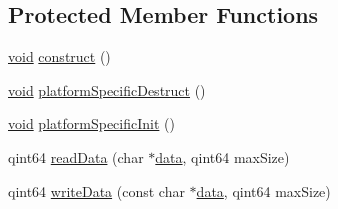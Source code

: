 \subsection*{Protected Member Functions}
\begin{DoxyCompactItemize}
\item 
\hyperlink{group___u_a_v_objects_plugin_ga444cf2ff3f0ecbe028adce838d373f5c}{void} \hyperlink{class_qext_serial_port_ab53747b8ff712492f96dc2f5cdb8b67a}{construct} ()
\item 
\hyperlink{group___u_a_v_objects_plugin_ga444cf2ff3f0ecbe028adce838d373f5c}{void} \hyperlink{class_qext_serial_port_a063fb59c7e39c6d232d72d1cfed80f62}{platform\-Specific\-Destruct} ()
\item 
\hyperlink{group___u_a_v_objects_plugin_ga444cf2ff3f0ecbe028adce838d373f5c}{void} \hyperlink{class_qext_serial_port_af03212eb598873e57e40cb0e11404136}{platform\-Specific\-Init} ()
\item 
qint64 \hyperlink{class_qext_serial_port_a7bcf7ba45f4c02607ceca83d00f9def4}{read\-Data} (char $\ast$\hyperlink{glext_8h_a8850df0785e6fbcc2351af3b686b8c7a}{data}, qint64 max\-Size)
\item 
qint64 \hyperlink{class_qext_serial_port_a23b32aebe729afd58d7ba6e409d29d1f}{write\-Data} (const char $\ast$\hyperlink{glext_8h_a8850df0785e6fbcc2351af3b686b8c7a}{data}, qint64 max\-Size)
\end{DoxyCompactItemize}

